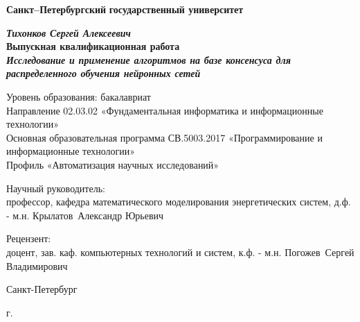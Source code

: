 \begin{titlepage}
\begin{center}
\textbf{Санкт--Петербургский}
\textbf{государственный университет}

\vspace{35mm}

\textbf{\textit{\large Тихонков Сергей Алексеевич}} \\[8mm]
\textbf{\large Выпускная квалификационная работа}\\[3mm]
\textbf{\textit{\large Исследование и применение алгоритмов на базе консенсуса для распределенного обучения нейронных сетей}}

\vspace{20mm}
Уровень образования: бакалавриат\\
Направление 02.03.02 «Фундаментальная информатика и информационные технологии»\\
Основная образовательная программа СВ.5003.2017
«Программирование и информационные технологии»\\
Профиль «Автоматизация научных исследований»\\[30mm]


\begin{flushright}
{Научный руководитель:} \\
профессор, кафедра математического моделирования энергетических систем, д.ф. - м.н.  Крылатов~Александр Юрьевич
\end{flushright}
\begin{flushright}
{Рецензент:} \\
доцент, зав. каф. компьютерных технологий и систем, к.ф. - м.н.  Погожев~Сергей Владимирович
\end{flushright}

\vfill 

{Санкт-Петербург}
\par{\the\year{} г.}
\end{center}
\end{titlepage}
\restoregeometry
\addtocounter{page}{1}
